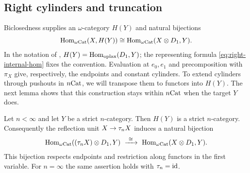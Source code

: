 \subsection{Right cylinders and truncation}

Biclosedness supplies an $\omega$-category $H(Y)$ and natural
bijections
\begin{equation}\label{eq:right-internal-hom}
 \operatorname{Hom}_{\omega\mathrm{Cat}}(X,H(Y))
   \cong\operatorname{Hom}_{\omega\mathrm{Cat}}(X\otimes D_{1},Y).
\end{equation}
In the notation of \cite[\S A.18]{AraMaltsiniotis2020},
$H(Y)=\operatorname{Hom}_{\mathrm{oplax}}(D_{1},Y)$; the representing formula
\eqref{eq:right-internal-hom} fixes the convention.
Evaluation at $e_0,e_1$ and precomposition with $\pi_X$ give,
respectively, the endpoints and constant cylinders.
To extend cylinders through pushouts in $n\mathrm{Cat}$, we will transpose
them to functors into $H(Y)$.  The next lemma shows that this
construction stays within $n\mathrm{Cat}$ when the target $Y$ does.

\begin{lemma}\label{lem:internal-truncation}
Let $n<\infty$ and let $Y$ be a strict $n$-category.  Then $H(Y)$ is a
strict $n$-category.  Consequently the reflection unit $X\to\tau_n X$
induces a natural bijection
\begin{equation}\label{eq:truncated-cylinder-bijection}
 \operatorname{Hom}_{\omega\mathrm{Cat}}((\tau_n X)\otimes D_{1},Y)
 \ \xrightarrow{\ \cong\ }\
 \operatorname{Hom}_{\omega\mathrm{Cat}}(X\otimes D_{1},Y).
\end{equation}
This bijection respects endpoints and restriction along functors in
the first variable.  For $n=\infty$ the same assertion holds with
$\tau_n=\mathrm{id}$.
\end{lemma}

